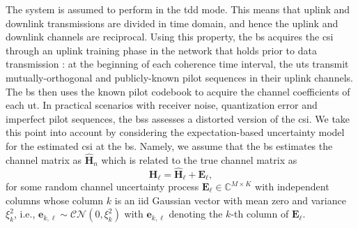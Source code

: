 \documentclass[12pt,draftclsnofoot,onecolumn,journal]{IEEEtran}
\newcommand{\brc}[1]{ \left( #1 \right) }
\begin{document}
The system is assumed to perform in the \ac{tdd} mode. This means that uplink and downlink transmissions are divided in time domain, and hence the uplink and downlink channels are reciprocal. Using this property, the \ac{bs} acquires the \ac{csi} through an uplink training phase in the network that holds prior to data transmission \cite{jose2011channel}: at the beginning of each coherence time interval, the \acp{ut} transmit mutually-orthogonal and publicly-known pilot sequences in their uplink channels. The \ac{bs} then uses the known pilot codebook to acquire the channel coefficients of each \ac{ut}. In practical scenarios with receiver noise, quantization error and imperfect pilot sequences, the \acp{bs} assesses a distorted version of the \ac{csi}. We take this point into account by considering the expectation-based uncertainty model for the estimated \ac{csi} at the \ac{bs}. Namely, we assume that the \ac{bs} estimates the channel matrix as $\hat{\mathbf H}_n$ which is related to the true channel matrix as \cite{zetterberg2011experimental}
\begin{equation}
	\mathbf H_\ell = \hat{\mathbf H}_\ell + \mathbf E_\ell,
\end{equation}
for some random channel uncertainty process $\mathbf E_\ell \in\mathbb C^{M\times K}$ with independent columns whose column $k$ is an \ac{iid} Gaussian vector with mean zero and variance $\xi_k^2$, i.e., $\mathbf{e}_{k,\ell} \sim \mathcal{CN} \brc{ 0, \xi_k^2 }$ with $\mathbf{e}_{k,\ell}$ denoting the $k$-th column of $\mathbf E_\ell$. 

\end{document}
